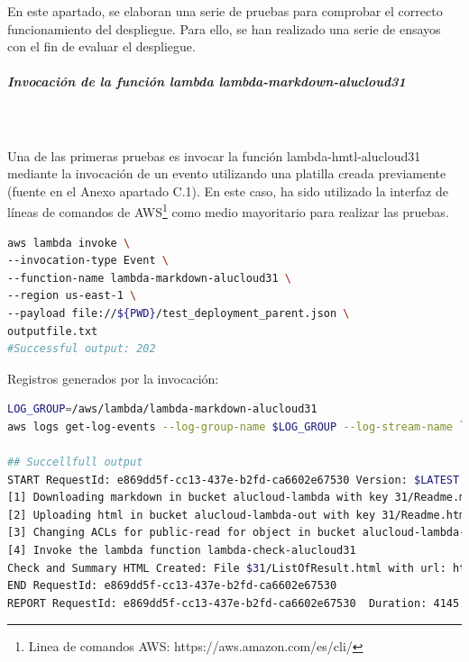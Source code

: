 \documentclass[
]{article}
\begin{document}
En este apartado, se elaboran una serie de pruebas para comprobar el
correcto funcionamiento del despliegue. Para ello, se han realizado una serie de ensayos con el fin de evaluar el despliegue.

\hypertarget{header-n180}{%
\subparagraph{Invocación de la función lambda
lambda-markdown-alucloud31}\label{header-n180}}
\leavevmode
\\
\\
Una de las primeras pruebas es invocar la función lambda-hmtl-alucloud31 mediante la invocación de un evento utilizando una platilla creada previamente (fuente en el Anexo apartado C.1). En este caso, ha sido utilizado la interfaz de líneas de comandos de AWS\footnote{Linea de comandos AWS: https://aws.amazon.com/es/cli/} como medio mayoritario para realizar las pruebas. 
\begin{lstlisting}[language=bash,caption={Comando de invocación mediante plantilla}]
aws lambda invoke \
--invocation-type Event \
--function-name lambda-markdown-alucloud31 \
--region us-east-1 \
--payload file://${PWD}/test_deployment_parent.json \
outputfile.txt
#Successful output: 202
\end{lstlisting}

Registros generados por la invocación:

\begin{lstlisting}[language=bash,caption={Comando para obtener Logs}]
LOG_GROUP=/aws/lambda/lambda-markdown-alucloud31
aws logs get-log-events --log-group-name $LOG_GROUP --log-stream-name `aws logs describe-log-streams --log-group-name $LOG_GROUP --max-items 1 --order-by LastEventTime --descending --query logStreams[].logStreamName --output text | head -n 1` --query events[].message --output text

## Succellfull output
START RequestId: e869dd5f-cc13-437e-b2fd-ca6602e67530 Version: $LATEST
[1] Downloading markdown in bucket alucloud-lambda with key 31/Readme.md
[2] Uploading html in bucket alucloud-lambda-out with key 31/Readme.html
[3] Changing ACLs for public-read for object in bucket alucloud-lambda-out with key 31/Readme.html
[4] Invoke the lambda function lambda-check-alucloud31
Check and Summary HTML Created: File $31/ListOfResult.html with url: https://alucloud-lambda-out.s3.amazonaws.com/31/ListOfResult.html
END RequestId: e869dd5f-cc13-437e-b2fd-ca6602e67530
REPORT RequestId: e869dd5f-cc13-437e-b2fd-ca6602e67530	Duration: 4145.55 ms	Billed Duration: 4146 ms	Memory Size: 128 MB	Max Memory Used: 84 MB	Init Duration: 509.80 ms
\end{lstlisting}
\end{document}
